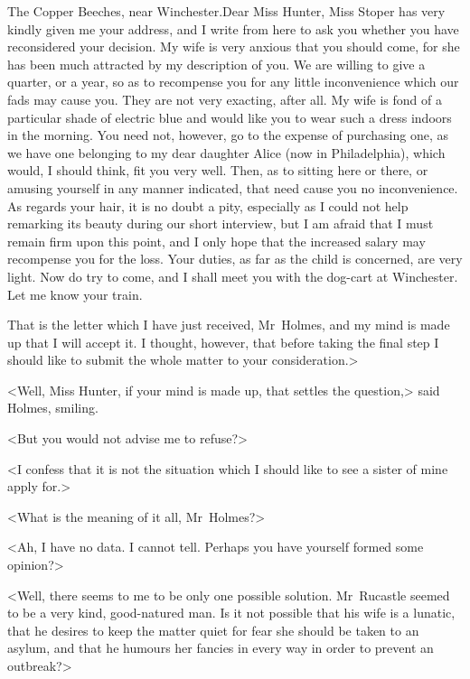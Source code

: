 \begin{mail}{The Copper Beeches, near Winchester.}{Dear Miss Hunter,}
Miss Stoper has very kindly given me your address, and I write from here to ask you whether you have reconsidered your decision. My wife is very anxious that you should come, for she has been much attracted by my description of you. We are willing to give  a quarter, or  a year, so as to recompense you for any little inconvenience which our fads may cause you. They are not very exacting, after all. My wife is fond of a particular shade of electric blue and would like you to wear such a dress indoors in the morning. You need not, however, go to the expense of purchasing one, as we have one belonging to my dear daughter Alice (now in Philadelphia), which would, I should think, fit you very well. Then, as to sitting here or there, or amusing yourself in any manner indicated, that need cause you no inconvenience. As regards your hair, it is no doubt a pity, especially as I could not help remarking its beauty during our short interview, but I am afraid that I must remain firm upon this point, and I only hope that the increased salary may recompense you for the loss. Your duties, as far as the child is concerned, are very light. Now do try to come, and I shall meet you with the dog-cart at Winchester. Let me know your train. 

\end{mail}

That is the letter which I have just received, Mr~Holmes, and my mind is made up that I will accept it. I thought, however, that before taking the final step I should like to submit the whole matter to your consideration.>

<Well, Miss Hunter, if your mind is made up, that settles the question,> said Holmes, smiling.

<But you would not advise me to refuse?>

<I confess that it is not the situation which I should like to see a sister of mine apply for.>

<What is the meaning of it all, Mr~Holmes?>

<Ah, I have no data. I cannot tell. Perhaps you have yourself formed some opinion?>

<Well, there seems to me to be only one possible solution. Mr~Rucastle seemed to be a very kind, good-natured man. Is it not possible that his wife is a lunatic, that he desires to keep the matter quiet for fear she should be taken to an asylum, and that he humours her fancies in every way in order to prevent an outbreak?>

